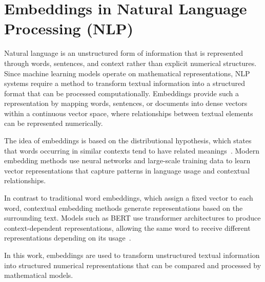 \section{Embeddings in Natural Language Processing (NLP)}

Natural language is an unstructured form of information that is represented through words, sentences, and context rather than explicit numerical structures.
Since machine learning models operate on mathematical representations, NLP systems require a method to transform textual information into a structured format that can be processed computationally. 
Embeddings provide such a representation by mapping words, sentences, or documents into dense vectors within a continuous vector space, where relationships between textual elements can be represented numerically.

The idea of embeddings is based on the distributional hypothesis, which states that words occurring in similar contexts tend to have related meanings~\cite{harris1954}. 
Modern embedding methods use neural networks and large-scale training data to learn vector representations that capture patterns in language usage and contextual relationships.

In contrast to traditional word embeddings, which assign a fixed vector to each word, contextual embedding methods generate representations based on the surrounding text. 
Models such as BERT use transformer architectures to produce context-dependent representations, allowing the same word to receive different representations depending on its usage~\cite{devlin2019bert}.

In this work, embeddings are used to transform unstructured textual information into structured numerical representations that can be compared and processed by mathematical models.